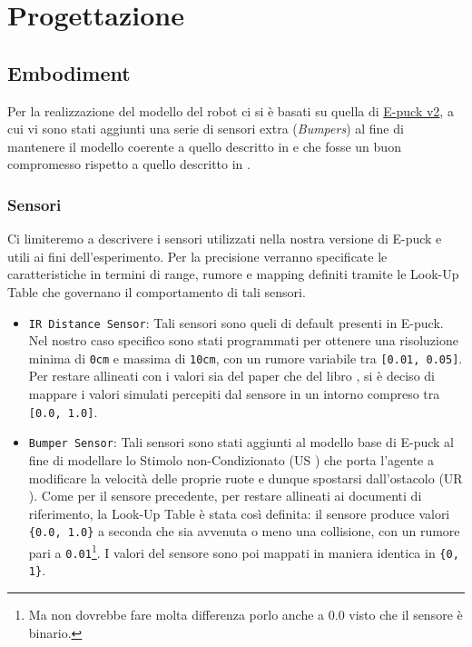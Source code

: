 \section{Progettazione}

\subsection{Embodiment}

Per la realizzazione del modello del robot ci si è basati su quella di \href{https://www.cyberbotics.com/e-puck}{E-puck v2}, a cui vi sono stati aggiunti una serie di sensori extra (\textit{Bumpers}) al fine di mantenere il modello coerente a quello descritto in \cite{pfeifer2001understanding} e che fosse un buon compromesso rispetto a quello descritto in \cite{verschure1992distributed}.

\subsubsection{Sensori}

Ci limiteremo a descrivere i sensori utilizzati nella nostra versione di E-puck e utili ai fini dell'esperimento. Per la precisione verranno specificate le caratteristiche in termini di range, rumore e mapping definiti tramite le Look-Up Table che governano il comportamento di tali sensori.

\begin{itemize}
    \item \texttt{IR Distance Sensor}: Tali sensori sono queli di default presenti in E-puck. Nel nostro caso specifico sono stati programmati per ottenere una risoluzione minima di \texttt{0cm} e massima di \texttt{10cm}, con un rumore variabile tra \texttt{[0.01, 0.05]}. Per restare allineati con i valori sia del paper \cite{verschure1992distributed} che del libro \cite{pfeifer2001understanding}, si è deciso di mappare i valori simulati percepiti dal sensore in un intorno compreso tra \texttt{[0.0, 1.0]}.
    
    \item \texttt{Bumper Sensor}: Tali sensori sono stati aggiunti al modello base di E-puck al fine di modellare lo Stimolo non-Condizionato (US \cite{verschure1992distributed}) che porta l'agente a modificare la velocità delle proprie ruote e dunque spostarsi dall'ostacolo (UR \cite{verschure1992distributed}).
    Come per il sensore precedente, per restare allineati ai documenti di riferimento, la Look-Up Table è stata così definita: il sensore produce valori \texttt{\{0.0, 1.0\}} a seconda che sia avvenuta o meno una collisione, con un rumore pari a \texttt{0.01}\footnote{Ma non dovrebbe fare molta differenza porlo anche a 0.0 visto che il sensore è binario.}. I valori del sensore sono poi mappati in maniera identica in \texttt{\{0, 1\}}.
\end{itemize}

